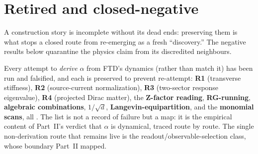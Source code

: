 \section{Retired and closed-negative}\label{sec:closed}
A construction story is incomplete without its dead ends: preserving them is what
stops a closed route from re-emerging as a fresh ``discovery.'' The negative
results below quarantine the physics claim from its discredited neighbours.

 Every attempt
to \emph{derive} $\alpha$ from FTD's dynamics (rather than match it) has
been run and falsified, and each is preserved to prevent re-attempt: \textbf{R1}
(transverse stiffness), \textbf{R2} (source-current normalization), \textbf{R3}
(two-sector response eigenvalue), \textbf{R4} (projected Dirac matter), the
\textbf{Z-factor reading}, \textbf{RG-running}, \textbf{algebraic combinations},
\textbf{$1/\sqrt d$}, \textbf{Langevin-equipartition}, and the \textbf{monomial
scans}, all . The list is not a record of failure but a map: it is
the empirical content of Part~II's verdict that $\alpha$ is dynamical, traced
route by route. The single non-derivation route that remains live is the
readout/observable-selection class, whose boundary Part~II mapped.

